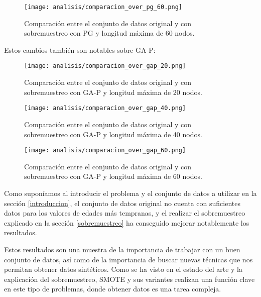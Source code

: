 \begin{figure}[H]
    \centering
	  \texttt{[image: analisis/comparacion\_over\_pg\_60.png]}
	  \caption{Comparación entre el conjunto de datos original y con sobremuestreo con PG y longitud máxima de 60 nodos.}\label{fig:cmp_pg_over_60}

\end{figure}

Estos cambios también son notables sobre GA-P:

\begin{figure}[H]
    \centering
	  \texttt{[image: analisis/comparacion\_over\_gap\_20.png]}
	  \caption{Comparación entre el conjunto de datos original y con sobremuestreo con GA-P y longitud máxima de 20 nodos.}\label{fig:cmp_gap_over_20}

\end{figure}

\begin{figure}[H]
    \centering
	  \texttt{[image: analisis/comparacion\_over\_gap\_40.png]}
	  \caption{Comparación entre el conjunto de datos original y con sobremuestreo con GA-P y longitud máxima de 40 nodos.}\label{fig:cmp_gap_over_40}

\end{figure}

\begin{figure}[H]
    \centering
	  \texttt{[image: analisis/comparacion\_over\_gap\_60.png]}
	  \caption{Comparación entre el conjunto de datos original y con sobremuestreo con GA-P y longitud máxima de 60 nodos.}\label{fig:cmp_gap_over_60}

\end{figure}

Como suponíamos al introducir el problema y el conjunto de datos a utilizar en la sección \ref{introduccion}, el conjunto de datos original no cuenta con suficientes datos para los valores de edades más tempranas, y el realizar el sobremuestreo explicado en la sección \ref{sobremuestreo} ha conseguido mejorar notablemente los resultados.

Estos resultados son una muestra de la importancia de trabajar con un buen conjunto de datos, así como de la importancia de buscar nuevas técnicas que nos permitan obtener datos sintéticos. Como se ha visto en el estado del arte y la explicación del sobremuestreo, SMOTE y sus variantes realizan una función clave en este tipo de problemas, donde obtener datos es una tarea compleja.

